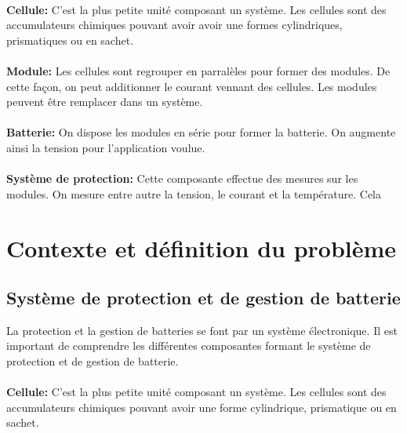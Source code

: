 		\paragraph{}
		\textbf{Cellule:} C'est la plus petite unité composant un système. Les cellules sont des accumulateurs chimiques pouvant avoir avoir une formes cylindriques, prismatiques ou en sachet.  
		
		\paragraph{}
		\textbf{Module:} Les cellules sont regrouper en parralèles pour former des modules. De cette façon, on peut additionner le courant vennant des cellules. Les modules peuvent être remplacer dans un système.
		
		\paragraph{}
		\textbf{Batterie:} On dispose les modules en série pour former la batterie. On augmente ainsi la tension pour l'application voulue.
		
		\paragraph{}
		\textbf{Système de protection:} Cette composante effectue des mesures sur les modules. On mesure entre autre la tension, le courant et la température. Cela \section{Contexte et définition du problème}

		
	\subsection{Système de protection et de gestion de batterie}
		La protection et la gestion de batteries se font par un système électronique. Il est important de comprendre les différentes composantes formant le système de protection et de gestion de batterie.
	
		\paragraph{}
		\textbf{Cellule:} C'est la plus petite unité composant un système. Les cellules sont des accumulateurs chimiques pouvant avoir une forme cylindrique, prismatique ou en sachet.  
		
